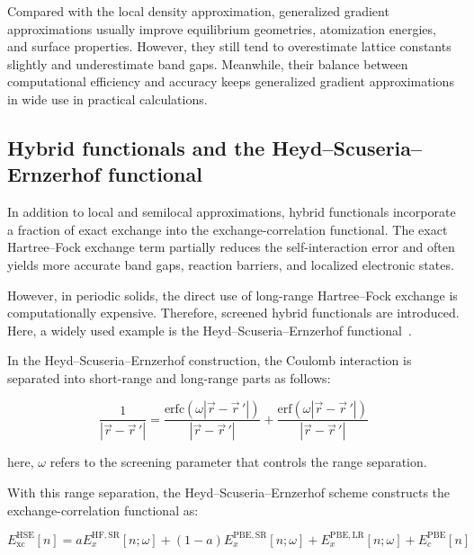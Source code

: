 Compared with the local density approximation,
generalized gradient approximations usually improve equilibrium geometries,
atomization energies, and surface properties.
However, they still tend to overestimate lattice constants slightly and underestimate band gaps.
Meanwhile, their balance between computational efficiency and accuracy keeps generalized gradient approximations in wide use in practical calculations.

\subsection[Hybrid functionals and Heyd--Scuseria--Ernzerhof functional]{Hybrid functionals and the Heyd--Scuseria--Ernzerhof functional}

In addition to local and semilocal approximations,
hybrid functionals incorporate a fraction of exact exchange into the exchange-correlation functional.
The exact Hartree--Fock exchange term partially reduces the self-interaction error and often yields more accurate band gaps, reaction barriers, and localized electronic states.

However, in periodic solids,
the direct use of long-range Hartree--Fock exchange is computationally expensive.
Therefore, screened hybrid functionals are introduced.
Here, a widely used example is the Heyd--Scuseria--Ernzerhof functional~\cite{heyd2003hybrid}.

In the Heyd--Scuseria--Ernzerhof construction,
the Coulomb interaction is separated into short-range and long-range parts as follows:

\begin{equation}
    \frac{1}{|\vec{r}-\vec{r}\,'|}
    = \frac{\mathrm{erfc}\left(\omega |\vec{r}-\vec{r}\,'|\right)}{|\vec{r}-\vec{r}\,'|}
    + \frac{\mathrm{erf}\left(\omega |\vec{r}-\vec{r}\,'|\right)}{|\vec{r}-\vec{r}\,'|}
\label{HSE_range_separation_of_Coulomb_interaction}
\end{equation}

here, $\omega$ refers to the screening parameter that controls the range separation.

With this range separation, the Heyd--Scuseria--Ernzerhof scheme constructs the exchange-correlation functional as:

\begin{equation}
    E_\mathrm{xc}^\mathrm{HSE}[n]
    = aE_x^{\mathrm{HF},\mathrm{SR}}[n;\omega]
    + (1-a)E_x^{\mathrm{PBE},\mathrm{SR}}[n;\omega]
    + E_x^{\mathrm{PBE},\mathrm{LR}}[n;\omega]
    + E_c^\mathrm{PBE}[n]
\label{HSE_exchange_correlation_functional}
\end{equation}

